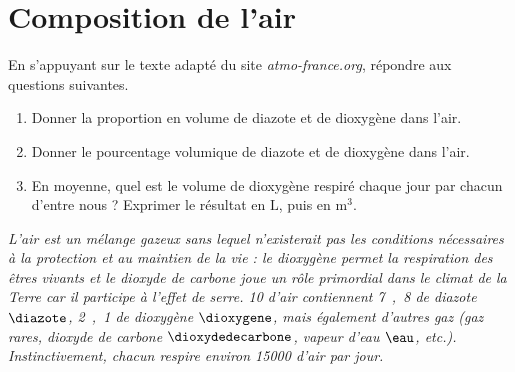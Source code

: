\section*{Composition de l'air}

En s'appuyant sur le texte adapté du site \emph{atmo-france.org}, répondre aux questions suivantes.

\begin{enumerate}
\item Donner la proportion en volume de diazote et de dioxygène dans l'air.
\item Donner le pourcentage volumique de diazote et de dioxygène dans l'air.
\item En moyenne, quel est le volume de dioxygène respiré chaque jour par chacun d'entre nous ?
Exprimer le résultat en $\mathrm{L}$, puis en $\mathrm{m}^3$.
\end{enumerate}

\noindent
\og
\textit{
L'air est un mélange gazeux sans lequel n'existerait pas les conditions nécessaires à la protection et au maintien de la vie : le dioxygène permet la respiration des êtres vivants et le dioxyde de carbone joue un rôle primordial dans le climat de la Terre car il participe à l'effet de serre.
\unit{10}{\liter} d'air contiennent \unit{7{,}8}{\liter} de diazote $\diazote$, \unit{2{,}1}{\liter} de dioxygène $\dioxygene$,  mais également d'autres gaz (gaz rares, dioxyde de carbone $\dioxydedecarbone$, vapeur d'eau $\eau$, etc.).
Instinctivement, chacun respire environ \unit{15000}{\liter} d'air par jour.
}
\fg{}

